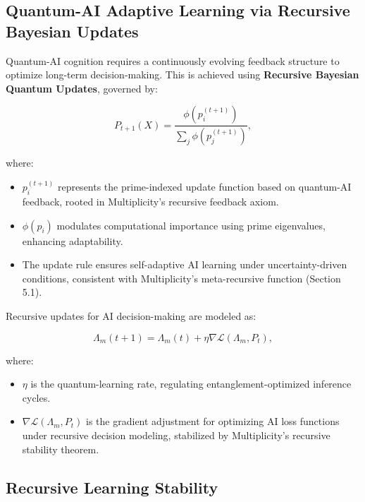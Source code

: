 \documentclass[12pt]{article}
\begin{document}
\subsection{Quantum-AI Adaptive Learning via Recursive Bayesian Updates}

Quantum-AI cognition requires a continuously evolving feedback structure to optimize long-term decision-making. This is achieved using \textbf{Recursive Bayesian Quantum Updates}, governed by:

\begin{equation}
    P_{t+1} (X) = \frac{\phi(p^{(t+1)}_i)}{\sum_j \phi(p^{(t+1)}_j)},
\end{equation}

where:
\begin{itemize}
    \item \(p^{(t+1)}_i\) represents the prime-indexed update function based on quantum-AI feedback, rooted in Multiplicity’s recursive feedback axiom.
    \item \(\phi(p_i)\) modulates computational importance using prime eigenvalues, enhancing adaptability.
    \item The update rule ensures self-adaptive AI learning under uncertainty-driven conditions, consistent with Multiplicity’s meta-recursive function (Section 5.1).
\end{itemize}

Recursive updates for AI decision-making are modeled as:

\begin{equation}
    \Lambda_m (t+1) = \Lambda_m (t) + \eta \nabla \mathcal{L} (\Lambda_m, P_t),
\end{equation}

where:
\begin{itemize}
    \item \(\eta\) is the quantum-learning rate, regulating entanglement-optimized inference cycles.
    \item \(\nabla \mathcal{L} (\Lambda_m, P_t)\) is the gradient adjustment for optimizing AI loss functions under recursive decision modeling, stabilized by Multiplicity’s recursive stability theorem.
\end{itemize}

\subsection{Recursive Learning Stability}
\end{document}
